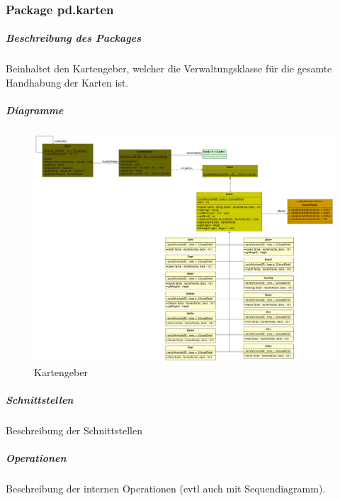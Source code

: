 \documentclass[a4paper,12pt,halfparskip,DIV12]{scrartcl}
\begin{document}
\clearpage
\subsubsection{Package pd.karten} %
\label{ssub:package_pd_karten}
\subparagraph{Beschreibung des Packages} %
\label{ssub:beschreibung_des_packages}
Beinhaltet den Kartengeber, welcher die Verwaltungsklasse für die gesamte Handhabung der Karten ist.
\subparagraph{Diagramme} %
\label{ssub:diagramme}
\begin{figure}[h]
	\centering
	\includegraphics[width=\textwidth]{pd_kartengeber}
	\caption{Kartengeber}
	\label{fig:pd_kartengeber}
\end{figure}
\subparagraph{Schnittstellen} %
\label{ssub:schnittstellen}
Beschreibung der Schnittstellen
\subparagraph{Operationen} %
\label{ssub:operationen}
Beschreibung der internen Operationen (evtl auch mit Sequendiagramm).

\clearpage
\end{document}
